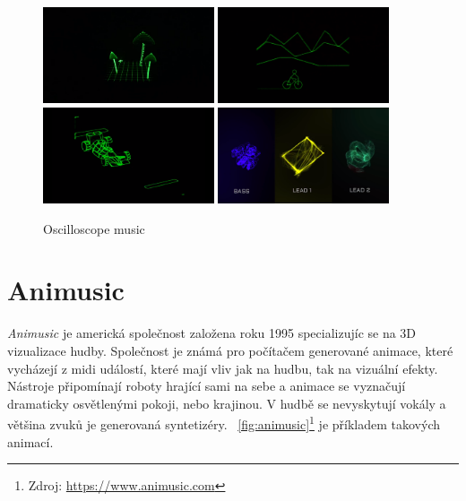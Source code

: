 \documentclass[thesis=B, czech]{FITthesis}[2019/03/06]
\begin{document}
\begin{figure}
    \centering
    \noindent
    \includegraphics[width=0.45\textwidth]{images/osc1.png}\hspace{0.05\textwidth}%
    \includegraphics[width=0.45\textwidth]{images/osc2.png}\\[1em]
    \includegraphics[width=0.45\textwidth]{images/osc4.png}\hspace{0.05\textwidth}%
    \includegraphics[width=0.45\textwidth]{images/osc5.png}\par
    \caption[\textit{Oscilloscope music}]{\label{fig:oscilloscope}Oscilloscope music}
\end{figure}


\section{Animusic}

\textit{Animusic} je americká společnost založena roku 1995 specializujíc se na 3D vizualizace hudby. Společnost je známá pro počítačem generované animace, které vycházejí z \gls{midi} událostí, které mají vliv jak na hudbu, tak na vizuální efekty. Nástroje připomínají roboty hrající sami na sebe a animace se vyznačují dramaticky osvětlenými pokoji, nebo krajinou. V hudbě se nevyskytují vokály a většina zvuků je generovaná syntetizéry. \figurename~\ref{fig:animusic}\footnote{Zdroj: \url{https://www.animusic.com}} je příkladem takových animací.
\end{document}
